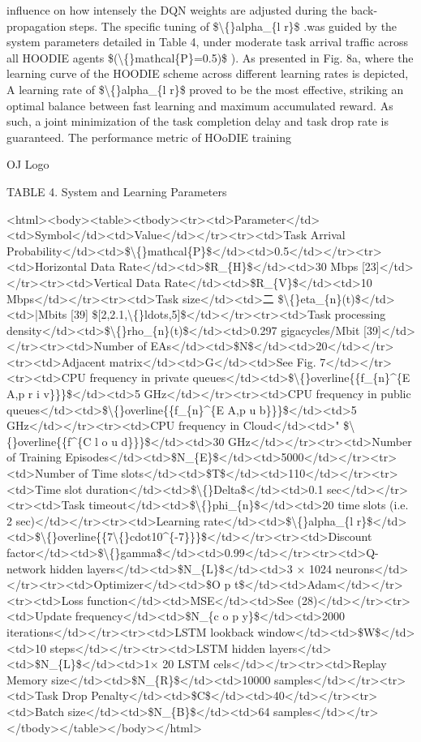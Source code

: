 \documentclass{article}
\begin{document}
influence on how intensely the DQN weights are adjusted during the back-propagation steps. The specific tuning of \$\textbackslash\{\}alpha\_\{l r\}\$ .was guided by the system parameters detailed in Table 4, under moderate task arrival traffic across all HOODIE agents \$(\textbackslash\{\}mathcal\{P\}=0.5)\$ ). As presented in Fig. 8a, where the learning curve of the HOODIE scheme across different learning rates is depicted, A learning rate of \$\textbackslash\{\}alpha\_\{l r\}\$ proved to be the most effective, striking an optimal balance between fast learning and maximum accumulated reward. As such, a joint minimization of the task completion delay and task drop rate is guaranteed. The performance metric of HOoDIE training

OJ Logo

TABLE 4. System and Learning Parameters

<html><body><table><tbody><tr><td>Parameter</td><td>Symbol</td><td>Value</td></tr><tr><td>Task Arrival Probability</td><td>\$\textbackslash\{\}mathcal\{P\}\$</td><td>0.5</td></tr><tr><td>Horizontal Data Rate</td><td>\$R\_\{H\}\$</td><td>30 Mbps [23]</td></tr><tr><td>Vertical Data Rate</td><td>\$R\_\{V\}\$</td><td>10 Mbps</td></tr><tr><td>Task size</td><td>二 \$\textbackslash\{\}eta\_\{n\}(t)\$</td><td>|Mbits [39] \$[2,2.1,\textbackslash\{\}ldots,5]\$</td></tr><tr><td>Task processing density</td><td>\$\textbackslash\{\}rho\_\{n\}(t)\$</td><td>0.297 gigacycles/Mbit [39]</td></tr><tr><td>Number of EAs</td><td>\$N\$</td><td>20</td></tr><tr><td>Adjacent matrix</td><td>G</td><td>See Fig. 7</td></tr><tr><td>CPU frequency in private queues</td><td>\$\textbackslash\{\}overline\{\{f\_\{n\}\textasciicircum{}\{E A,p r i v\}\}\}\$</td><td>5 GHz</td></tr><tr><td>CPU frequency in public queues</td><td>\$\textbackslash\{\}overline\{\{f\_\{n\}\textasciicircum{}\{E A,p u b\}\}\}\$</td><td>5 GHz</td></tr><tr><td>CPU frequency in Cloud</td><td>" \$\textbackslash\{\}overline\{\{f\textasciicircum{}\{C l o u d\}\}\}\$</td><td>30 GHz</td></tr><tr><td>Number of Training Episodes</td><td>\$N\_\{E\}\$</td><td>5000</td></tr><tr><td>Number of Time slots</td><td>\$T\$</td><td>110</td></tr><tr><td>Time slot duration</td><td>\$\textbackslash\{\}Delta\$</td><td>0.1 sec</td></tr><tr><td>Task timeout</td><td>\$\textbackslash\{\}phi\_\{n\}\$</td><td>20 time slots (i.e. 2 sec)</td></tr><tr><td>Learning rate</td><td>\$\textbackslash\{\}alpha\_\{l r\}\$</td><td>\$\textbackslash\{\}overline\{\{7\textbackslash\{\}cdot10\textasciicircum{}\{-7\}\}\}\$</td></tr><tr><td>Discount factor</td><td>\$\textbackslash\{\}gamma\$</td><td>0.99</td></tr><tr><td>Q-network hidden layers</td><td>\$N\_\{L\}\$</td><td>3 × 1024 neurons</td></tr><tr><td>Optimizer</td><td>\$O p t\$</td><td>Adam</td></tr><tr><td>Loss function</td><td>MSE</td><td>See (28)</td></tr><tr><td>Update frequency</td><td>\$N\_\{c o p y\}\$</td><td>2000 iterations</td></tr><tr><td>LSTM lookback window</td><td>\$W\$</td><td>10 steps</td></tr><tr><td>LSTM hidden layers</td><td>\$N\_\{L\}\$</td><td>1× 20 LSTM cels</td></tr><tr><td>Replay Memory size</td><td>\$N\_\{R\}\$</td><td>10000 samples</td></tr><tr><td>Task Drop Penalty</td><td>\$C\$</td><td>40</td></tr><tr><td>Batch size</td><td>\$N\_\{B\}\$</td><td>64 samples</td></tr></tbody></table></body></html>
\end{document}

